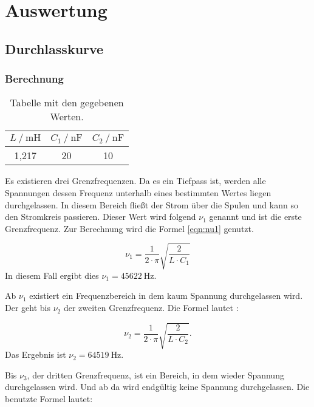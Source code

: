 \section{Auswertung}
\label{sec:Auswertung}

\subsection{Durchlasskurve}

\subsubsection{Berechnung}

\begin{table}
  \centering
  \caption{Tabelle mit den gegebenen Werten.}
  \label{tab:wertedurch}
  \begin{tabular}{c c c}
    \toprule
    $L \ /\ \si{\milli\henry}$ & $C_1 \ /\ \si{\nano\farad}$ & $C_2 \ /\ \si{\nano\farad}$ \\
    \midrule
    1,217 & 20 & 10\\
    \bottomrule
  \end{tabular}
\end{table}

Es existieren drei Grenzfrequenzen. Da es ein Tiefpass ist, werden alle Spannungen
dessen Frequenz unterhalb eines bestimmten Wertes liegen durchgelassen.
In diesem Bereich fließt der Strom über die Spulen und kann so den Stromkreis
passieren. Dieser Wert
wird folgend $\nu_1$ genannt und ist die erste Grenzfrequenz.
Zur Berechnung wird die Formel \eqref{eqn:nu1} genutzt.

\begin{equation}
  \nu_1 = \frac{1}{2\cdot\pi}\sqrt{\frac{2}{L \cdot C_1}}
  \label{eqn:nu1}
\end{equation}
In diesem Fall ergibt dies $\nu_1 = \SI{45622}{\hertz}$.

Ab $\nu_1$ existiert ein Frequenzbereich in dem kaum Spannung durchgelassen wird.
Der geht bis $\nu_2$ der zweiten Grenzfrequenz. Die Formel lautet :

\begin{equation}
  \nu_2 = \frac{1}{2\cdot\pi}\sqrt{\frac{2}{L \cdot C_2}}.
\end{equation}
Das Ergebnis ist $\nu_2 = \SI{64519}{\hertz}$.

Bis $\nu_3$, der dritten Grenzfrequenz, ist ein Bereich, in dem wieder Spannung
durchgelassen wird. Und ab da wird endgültig keine Spannung durchgelassen. Die
benutzte Formel lautet:

